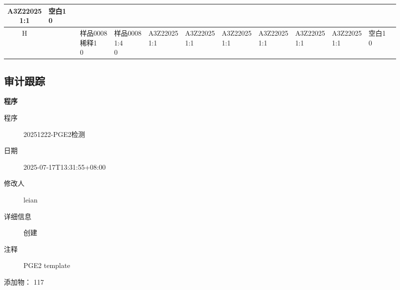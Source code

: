 \documentclass[UTF8,10pt,a4paper,fontset=fandol]{ctexart}
\newcommand{\fieldvalue}[1]{#1}
\begin{document}
\begin{center}
\begin{tabular}{c|*{12}{p{0.58cm}|}}
\shortstack{A3Z22025\\1:1} &
\shortstack{空白1\\0} &
\\
\hline
H &
 & &
\shortstack{样品0008\\稀释1\\0} &
\shortstack{样品0008\\1:4\\0} &
\shortstack{A3Z22025\\1:1} &
\shortstack{A3Z22025\\1:1} &
\shortstack{A3Z22025\\1:1} &
\shortstack{A3Z22025\\1:1} &
\shortstack{A3Z22025\\1:1} &
\shortstack{A3Z22025\\1:1} &
\shortstack{空白1\\0} &
\\
\hline
\end{tabular}
\end{center}


\subsection{审计跟踪}

\noindent
\textbf{程序}

\begin{description}
\item[程序]
\fieldvalue{20251222-PGE2检测}

\item[日期]
\fieldvalue{2025-07-17T13:31:55+08:00}

\item[修改人]
\fieldvalue{leian}

\item[详细信息]
\fieldvalue{创建}

\item[注释]
\fieldvalue{PGE2 template}
\end{description}

\noindent
添加物： 
\fieldvalue{117}
\end{document}
